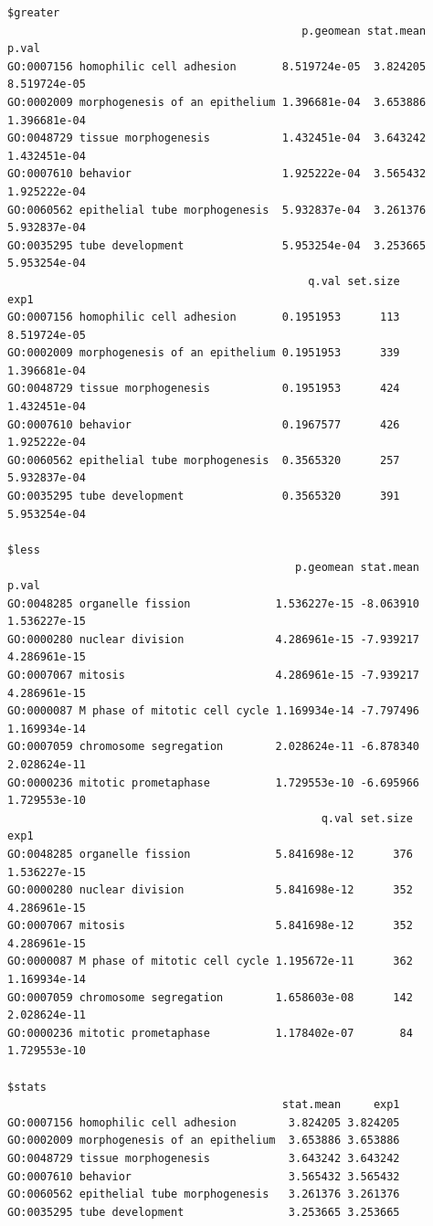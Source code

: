 \documentclass[
  letterpaper,
  DIV=11,
  numbers=noendperiod]{scrartcl}
\begin{document}
\begin{verbatim}
$greater
                                             p.geomean stat.mean        p.val
GO:0007156 homophilic cell adhesion       8.519724e-05  3.824205 8.519724e-05
GO:0002009 morphogenesis of an epithelium 1.396681e-04  3.653886 1.396681e-04
GO:0048729 tissue morphogenesis           1.432451e-04  3.643242 1.432451e-04
GO:0007610 behavior                       1.925222e-04  3.565432 1.925222e-04
GO:0060562 epithelial tube morphogenesis  5.932837e-04  3.261376 5.932837e-04
GO:0035295 tube development               5.953254e-04  3.253665 5.953254e-04
                                              q.val set.size         exp1
GO:0007156 homophilic cell adhesion       0.1951953      113 8.519724e-05
GO:0002009 morphogenesis of an epithelium 0.1951953      339 1.396681e-04
GO:0048729 tissue morphogenesis           0.1951953      424 1.432451e-04
GO:0007610 behavior                       0.1967577      426 1.925222e-04
GO:0060562 epithelial tube morphogenesis  0.3565320      257 5.932837e-04
GO:0035295 tube development               0.3565320      391 5.953254e-04

$less
                                            p.geomean stat.mean        p.val
GO:0048285 organelle fission             1.536227e-15 -8.063910 1.536227e-15
GO:0000280 nuclear division              4.286961e-15 -7.939217 4.286961e-15
GO:0007067 mitosis                       4.286961e-15 -7.939217 4.286961e-15
GO:0000087 M phase of mitotic cell cycle 1.169934e-14 -7.797496 1.169934e-14
GO:0007059 chromosome segregation        2.028624e-11 -6.878340 2.028624e-11
GO:0000236 mitotic prometaphase          1.729553e-10 -6.695966 1.729553e-10
                                                q.val set.size         exp1
GO:0048285 organelle fission             5.841698e-12      376 1.536227e-15
GO:0000280 nuclear division              5.841698e-12      352 4.286961e-15
GO:0007067 mitosis                       5.841698e-12      352 4.286961e-15
GO:0000087 M phase of mitotic cell cycle 1.195672e-11      362 1.169934e-14
GO:0007059 chromosome segregation        1.658603e-08      142 2.028624e-11
GO:0000236 mitotic prometaphase          1.178402e-07       84 1.729553e-10

$stats
                                          stat.mean     exp1
GO:0007156 homophilic cell adhesion        3.824205 3.824205
GO:0002009 morphogenesis of an epithelium  3.653886 3.653886
GO:0048729 tissue morphogenesis            3.643242 3.643242
GO:0007610 behavior                        3.565432 3.565432
GO:0060562 epithelial tube morphogenesis   3.261376 3.261376
GO:0035295 tube development                3.253665 3.253665
\end{verbatim}
\end{document}
